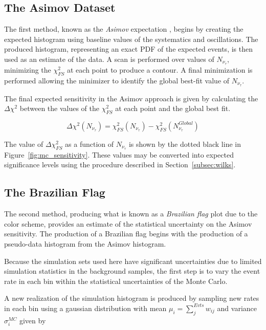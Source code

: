 \label{subsec:asimov}
\subsection{The Asimov Dataset}
The first method, known as the \emph{Asimov} expectation \cite{Asimov}, begins by creating the expected histogram using baseline values of the systematics and oscillations.
The produced histogram, representing an exact PDF of the expected events, is then used as an estimate of the data.
A scan is performed over values of  $N_{\nu_{\tau}}$, minimizing the $\chi^2_{FS}$ at each point to produce a contour.
A final minimization is performed allowing the minimizer to identify the global best-fit value of $N_{\nu_{\tau}}$.

The final expected sensitivity in the Asimov approach is given by calculating the $\Delta \chi^2$ between the values of the $\chi^2_{FS}$ at each point and the global best fit.

\begin{equation}
\label{eqn:delta_chi2}
	\Delta \chi^2 \left(N_{\nu_{\tau}}\right) = \chi^2_{FS}\left(N_{\nu_{\tau}}\right)  - \chi^2_{FS}\left(N^{Global}_{\nu_{\tau}}\right)
\end{equation}

The value of $\Delta \chi^2_{FS}$ as a function of $N_{\nu_{\tau}}$ is shown by the dotted black line in Figure~\ref{fig:mc_sensitivity}.
These values may be converted into expected significance levels using the procedure described in Section~\ref{subsec:wilks}.




\label{subsec:flag}
\subsection{The Brazilian Flag}
The second method, producing what is known as a \emph{Brazilian flag} plot due to the color scheme, provides an estimate of the statistical uncertainty on the Asimov sensitivity.
The production of a Brazilian flag begins with the production of a pseudo-data histogram from the Asimov histogram.

Because the simulation sets used here have significant uncertainties due to limited simulation statistics in the background samples, the first step is to vary the event rate in each bin within the statistical uncertainties of the Monte Carlo.

A new realization of the simulation histogram is produced by sampling new rates in each bin using a gaussian distribution with mean $\mu_i=\sum_j^{Evts}w_{ij}$ and variance $\sigma^{MC}_{i}$ given by 

